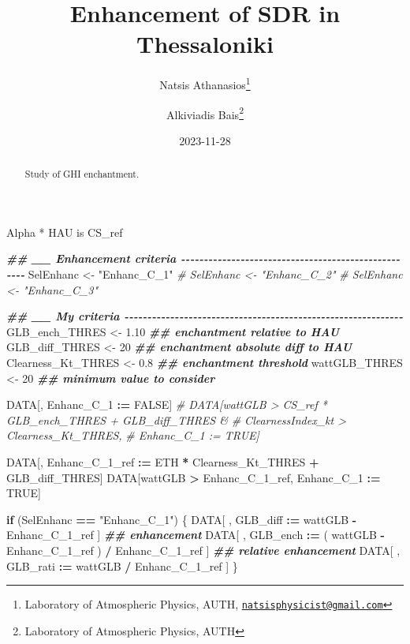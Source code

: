 \documentclass[
  10pt,
  a4paper,oneside]{article}
\title{Enhancement of SDR in Thessaloniki}
\author{Natsis Athanasios\footnote{Laboratory of Atmospheric Physics, AUTH, \href{mailto:natsisphysicist@gmail.com}{\nolinkurl{natsisphysicist@gmail.com}}} \and Alkiviadis Bais\footnote{Laboratory of Atmospheric Physics, AUTH}}
\date{2023-11-28}
\newenvironment{Shaded}{\begin{snugshade}}{\end{snugshade}}
\newcommand{\CommentTok}[1]{\textcolor[rgb]{0.56,0.35,0.01}{\textit{#1}}}
\newcommand{\ConstantTok}[1]{\textcolor[rgb]{0.56,0.35,0.01}{#1}}
\newcommand{\ControlFlowTok}[1]{\textcolor[rgb]{0.13,0.29,0.53}{\textbf{#1}}}
\newcommand{\DecValTok}[1]{\textcolor[rgb]{0.00,0.00,0.81}{#1}}
\newcommand{\DocumentationTok}[1]{\textcolor[rgb]{0.56,0.35,0.01}{\textbf{\textit{#1}}}}
\newcommand{\FloatTok}[1]{\textcolor[rgb]{0.00,0.00,0.81}{#1}}
\newcommand{\NormalTok}[1]{#1}
\newcommand{\OtherTok}[1]{\textcolor[rgb]{0.56,0.35,0.01}{#1}}
\newcommand{\SpecialCharTok}[1]{\textcolor[rgb]{0.81,0.36,0.00}{\textbf{#1}}}
\newcommand{\StringTok}[1]{\textcolor[rgb]{0.31,0.60,0.02}{#1}}
\begin{document}
\maketitle
\begin{abstract}
Study of GHI enchantment.
\end{abstract}

{
\hypersetup{linkcolor=}
\setcounter{tocdepth}{4}
\tableofcontents
}
Alpha * HAU is CS\_ref

\begin{Shaded}
\begin{Highlighting}[]
\DocumentationTok{\#\# \_\_ Enhancement criteria  {-}{-}{-}{-}{-}{-}{-}{-}{-}{-}{-}{-}{-}{-}{-}{-}{-}{-}{-}{-}{-}{-}{-}{-}{-}{-}{-}{-}{-}{-}{-}{-}{-}{-}{-}{-}{-}{-}{-}{-}{-}{-}{-}{-}{-}{-}{-}{-}{-}{-}{-}{-}}
\NormalTok{SelEnhanc }\OtherTok{\textless{}{-}} \StringTok{"Enhanc\_C\_1"}
\CommentTok{\# SelEnhanc \textless{}{-} "Enhanc\_C\_2"}
\CommentTok{\# SelEnhanc \textless{}{-} "Enhanc\_C\_3"}

\DocumentationTok{\#\# \_\_ My criteria  {-}{-}{-}{-}{-}{-}{-}{-}{-}{-}{-}{-}{-}{-}{-}{-}{-}{-}{-}{-}{-}{-}{-}{-}{-}{-}{-}{-}{-}{-}{-}{-}{-}{-}{-}{-}{-}{-}{-}{-}{-}{-}{-}{-}{-}{-}{-}{-}{-}{-}{-}{-}{-}{-}{-}{-}{-}{-}{-}{-}{-}}
\NormalTok{GLB\_ench\_THRES     }\OtherTok{\textless{}{-}}  \FloatTok{1.10} \DocumentationTok{\#\# enchantment relative to HAU}
\NormalTok{GLB\_diff\_THRES     }\OtherTok{\textless{}{-}} \DecValTok{20}    \DocumentationTok{\#\# enchantment absolute diff to HAU}
\NormalTok{Clearness\_Kt\_THRES }\OtherTok{\textless{}{-}}  \FloatTok{0.8}  \DocumentationTok{\#\# enchantment threshold}
\NormalTok{wattGLB\_THRES      }\OtherTok{\textless{}{-}} \DecValTok{20}    \DocumentationTok{\#\# minimum value to consider}

\NormalTok{DATA[, Enhanc\_C\_1 }\SpecialCharTok{:=} \ConstantTok{FALSE}\NormalTok{]}
\CommentTok{\# DATA[wattGLB           \textgreater{} CS\_ref * GLB\_ench\_THRES + GLB\_diff\_THRES \&}
\CommentTok{\#      ClearnessIndex\_kt \textgreater{} Clearness\_Kt\_THRES,}
\CommentTok{\#      Enhanc\_C\_1 := TRUE]}

\NormalTok{DATA[, Enhanc\_C\_1\_ref }\SpecialCharTok{:=}\NormalTok{ ETH }\SpecialCharTok{*}\NormalTok{ Clearness\_Kt\_THRES }\SpecialCharTok{+}\NormalTok{ GLB\_diff\_THRES]}
\NormalTok{DATA[wattGLB }\SpecialCharTok{\textgreater{}}\NormalTok{ Enhanc\_C\_1\_ref,}
\NormalTok{     Enhanc\_C\_1 }\SpecialCharTok{:=} \ConstantTok{TRUE}\NormalTok{]}

\ControlFlowTok{if}\NormalTok{ (SelEnhanc }\SpecialCharTok{==} \StringTok{"Enhanc\_C\_1"}\NormalTok{) \{}
\NormalTok{    DATA[ , GLB\_diff }\SpecialCharTok{:=}\NormalTok{   wattGLB }\SpecialCharTok{{-}}\NormalTok{ Enhanc\_C\_1\_ref                    ] }\DocumentationTok{\#\# enhancement}
\NormalTok{    DATA[ , GLB\_ench }\SpecialCharTok{:=}\NormalTok{ ( wattGLB }\SpecialCharTok{{-}}\NormalTok{ Enhanc\_C\_1\_ref ) }\SpecialCharTok{/}\NormalTok{ Enhanc\_C\_1\_ref ] }\DocumentationTok{\#\# relative enhancement}
\NormalTok{    DATA[ , GLB\_rati }\SpecialCharTok{:=}\NormalTok{   wattGLB }\SpecialCharTok{/}\NormalTok{ Enhanc\_C\_1\_ref                    ]}
\NormalTok{\}}



\end{Highlighting}
\end{Shaded}
\end{document}
